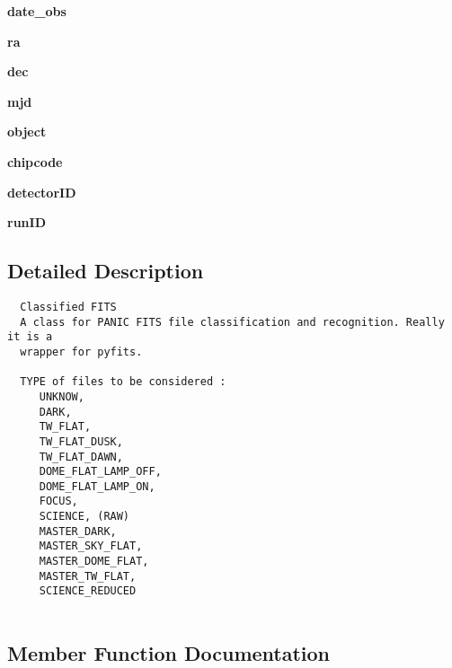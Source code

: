 \begin{CompactItemize}
\item 
\textbf{date\_\-obs}\label{classdatahandler_1_1dataclassifier_1_1ClFits_4b165af51e0c8ae653189214e83d1c9d}

\item 
\textbf{ra}\label{classdatahandler_1_1dataclassifier_1_1ClFits_2143c903b15455b126b71ce5ed9ea58c}

\item 
\textbf{dec}\label{classdatahandler_1_1dataclassifier_1_1ClFits_dd60fe6894dc5d967f094e238d88cbff}

\item 
\textbf{mjd}\label{classdatahandler_1_1dataclassifier_1_1ClFits_b7a6d4268a837ede32d6c994a1c8c126}

\item 
\textbf{object}\label{classdatahandler_1_1dataclassifier_1_1ClFits_fc76fa0831b91cc4f53335762b22c15d}

\item 
\textbf{chipcode}\label{classdatahandler_1_1dataclassifier_1_1ClFits_86fbc90f13f45efe777ee22f3e256ea8}

\item 
\textbf{detector\-ID}\label{classdatahandler_1_1dataclassifier_1_1ClFits_4343d074a55d9571babfd73c478e18c5}

\item 
\textbf{run\-ID}\label{classdatahandler_1_1dataclassifier_1_1ClFits_d5159427887e9fee37671f98e1464020}

\end{CompactItemize}


\subsection{Detailed Description}


\footnotesize\begin{verbatim}
  Classified FITS
  A class for PANIC FITS file classification and recognition. Really it is a
  wrapper for pyfits.

  TYPE of files to be considered :
     UNKNOW,
     DARK,
     TW_FLAT,
     TW_FLAT_DUSK,
     TW_FLAT_DAWN,
     DOME_FLAT_LAMP_OFF,
     DOME_FLAT_LAMP_ON,
     FOCUS,
     SCIENCE, (RAW)
     MASTER_DARK,
     MASTER_SKY_FLAT,
     MASTER_DOME_FLAT,
     MASTER_TW_FLAT,
     SCIENCE_REDUCED
     
\end{verbatim}
\normalsize
 



\subsection{Member Function Documentation}
